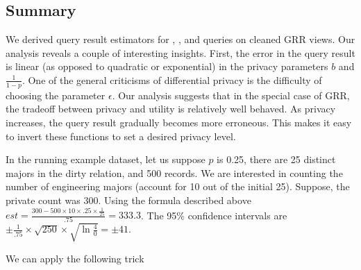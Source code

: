\subsection{Summary}
We derived query result estimators for \sumfunc, \avgfunc, and \countfunc queries on cleaned GRR views.
Our analysis reveals a couple of interesting insights.
First, the error in the query result is linear (as opposed to quadratic or exponential) in the privacy parameters $b$ and $\frac{1}{1-p}$.
One of the general criticisms of differential privacy is the difficulty of choosing the parameter $\epsilon$.
Our analysis suggests that in the special case of GRR, the tradeoff between privacy and utility is relatively well behaved.
As privacy increases, the query result gradually becomes more erroneous.
This makes it easy to invert these functions to set a desired privacy level.

\begin{example}
In the running example dataset, let us suppose $p$ is 0.25, there are 25 distinct majors in the dirty relation, and 500 records. We are interested in counting the number of engineering majors (account for 10 out of the initial 25). 
Suppose, the private count was $300$.
Using the formula described above $est = \frac{300-500\times10\times.25\times \frac{1}{25}}{.75}= 333.3$.
The 95\% confidence intervals are $ \pm \frac{1}{.75} \times \sqrt{250} \times \sqrt{\ln \frac 40}= \pm 41$.
\end{example}

\iffalse
We can apply the following trick

